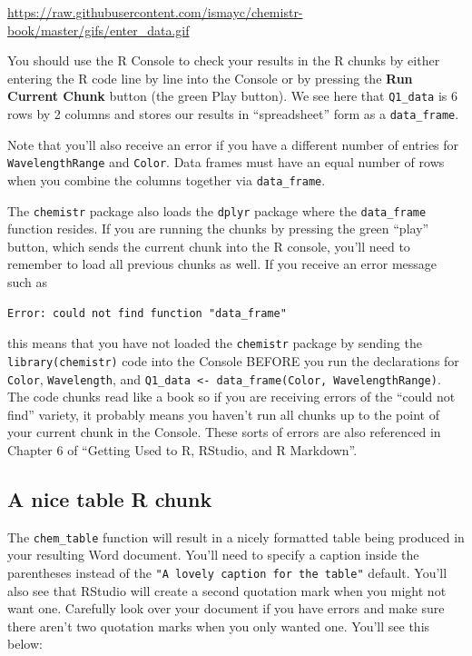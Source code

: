 \documentclass[]{tufte-book}
\begin{document}
\vspace{0.1in}

\begin{center}\footnotesize{\url{https://raw.githubusercontent.com/ismayc/chemistr-book/master/gifs/enter_data.gif}}\end{center}

\vspace{0.1in}

You should use the R Console to check your results in the R chunks by
either entering the R code line by line into the Console or by pressing
the \textbf{Run Current Chunk} button (the green Play button). We see
here that \texttt{Q1\_data} is 6 rows by 2 columns and stores our
results in ``spreadsheet'' form as a \texttt{data\_frame}.

Note that you'll also receive an error if you have a different number of
entries for \texttt{WavelengthRange} and \texttt{Color}. Data frames
must have an equal number of rows when you combine the columns together
via \texttt{data\_frame}.

The \texttt{chemistr} package also loads the \texttt{dplyr} package
where the \texttt{data\_frame} function resides. If you are running the
chunks by pressing the green ``play'' button, which sends the current
chunk into the R console, you'll need to remember to load all previous
chunks as well. If you receive an error message such as

\begin{verbatim}
Error: could not find function "data_frame"
\end{verbatim}

this means that you have not loaded the \texttt{chemistr} package by
sending the \texttt{library(chemistr)} code into the Console BEFORE you
run the declarations for \texttt{Color}, \texttt{Wavelength}, and
\texttt{Q1\_data\ \textless{}-\ data\_frame(Color,\ WavelengthRange)}.
The code chunks read like a book so if you are receiving errors of the
``could not find'' variety, it probably means you haven't run all chunks
up to the point of your current chunk in the Console. These sorts of
errors are also referenced in Chapter 6 of ``Getting Used to R, RStudio,
and R Markdown''\citep{usedtor2016}.

\subsection{A nice table R chunk}\label{a-nice-table-r-chunk}

The \texttt{chem\_table} function will result in a nicely formatted
table being produced in your resulting Word document. You'll need to
specify a caption inside the parentheses instead of the
\texttt{"A\ lovely\ caption\ for\ the\ table"} default. You'll also see
that RStudio will create a second quotation mark when you might not want
one. Carefully look over your document if you have errors and make sure
there aren't two quotation marks when you only wanted one. You'll see
this below:
\end{document}
